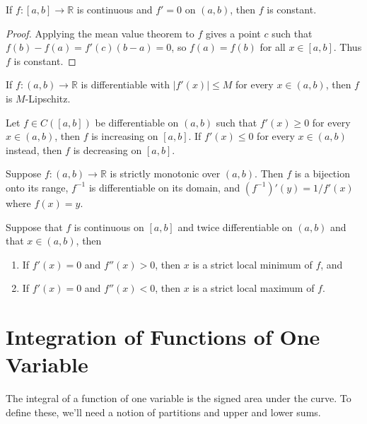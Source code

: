\documentclass[twoside,10pt]{report}
\begin{document}
\begin{cor}
	If $f:[a,b] \to \mathbb{R}$ is continuous and $f'=0$ on $(a,b)$, then $f$ is constant.
\end{cor}
\begin{proof}
	Applying the mean value theorem to $f$ gives a point $c$ such that $f(b)-f(a) = f'(c)(b-a) = 0$, so $f(a) = f(b)$ for all $x \in [a,b]$. Thus $f$ is constant.
\end{proof}

\begin{cor}
	If $f:(a,b)\to\mathbb{R}$ is differentiable with $|f'(x)|\leq M$ for every $x \in (a,b)$, then $f$ is $M$-Lipschitz.
\end{cor}

\begin{prop}
	Let $f \in C([a,b])$ be differentiable on $(a,b)$ such that $f'(x) \geq 0$ for every $x \in (a,b)$, then $f$ is increasing on $[a,b]$. If $f'(x) \leq 0$ for every $x \in(a,b)$ instead, then $f$ is decreasing on $[a,b]$.
\end{prop}

\begin{thrm}
	Suppose $f:(a,b) \to \mathbb{R}$ is strictly monotonic over $(a,b)$. Then $f$ is a bijection onto its range, $f^{-1}$ is differentiable on its domain, and $(f^{-1})'(y) = 1/f'(x)$ where $f(x) = y$.
\end{thrm}

\begin{prop}
	Suppose that $f$ is continuous on $[a,b]$ and twice differentiable on $(a,b)$ and that $x \in (a,b)$, then
	\begin{enumerate}
		\item If $f'(x) = 0$ and $f''(x) > 0$, then $x$ is a strict local minimum of $f$, and
		\item If $f'(x) = 0$ and $f''(x) < 0$, then $x$ is a strict local maximum of $f$.
	\end{enumerate}
\end{prop}


\section{Integration of Functions of One Variable}

The integral of a function of one variable is the signed area under the curve. To define these, we'll need a notion of partitions and upper and lower sums.
\end{document}
